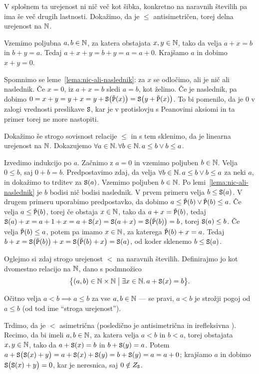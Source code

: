 V splošnem ta urejenost ni nič več kot šibka, konkretno na naravnih številih pa ima še več drugih lastnosti. Dokažimo, da je $\leq$ antisimetričen, torej delna urejenost na $\mathbb{N}$.

Vzemimo poljubna $a, b \in \mathbb{N}$, za katera obstajata $x, y \in \mathbb{N}$, tako da velja $a + x = b$ in $b + y = a$. Tedaj $a + x + y = b + y = a = a + 0$. Krajšamo $a$ in dobimo $x + y = 0$.

Spomnimo se leme~\ref{lema:nic-ali-naslednik}: za $x$ se odločimo, ali je nič ali naslednik. Če $x = 0$, iz $a + x = b$ sledi $a = b$, kot želimo. Če je naslednik, pa dobimo $0 = x + y = y + x = y + \mathtt{S}\big(\tilde{\mathtt{P}}(x)\big) = \mathtt{S}\big(y + \tilde{\mathtt{P}}(x)\big)$. To bi pomenilo, da je $0$ v zalogi vrednosti preslikave $\mathtt{S}$, kar je v protislovju s Peanovimi aksiomi in ta primer torej ne more nastopiti.

Dokažimo še strogo sovisnost relacije $\leq$ in s tem sklenimo, da je linearna urejenost na $\mathbb{N}$. Dokazujemo $\forall a \in \mathbb{N} .\,\forall b \in \mathbb{N} .\,{a \leq b \lor b \leq a}$.

Izvedimo indukcijo po $a$. Začnimo z $a = 0$ in vzemimo poljuben $b \in \mathbb{N}$. Velja $0 \leq b$, saj $0 + b = b$. Predpostavimo zdaj, da velja $\forall b \in \mathbb{N} .\,{a \leq b \lor b \leq a}$ za neki $a$, in dokažimo to trditev za $\mathtt{S}(a)$. Vzemimo poljuben $b \in \mathbb{N}$. Po lemi~\ref{lema:nic-ali-naslednik} je $b$ bodisi nič bodisi naslednik. V prvem primeru velja $b \leq \mathtt{S}(a)$. V drugem primeru uporabimo predpostavko, da dobimo $a \leq \tilde{\mathtt{P}}(b) \lor \tilde{\mathtt{P}}(b) \leq a$. Če velja $a \leq \tilde{\mathtt{P}}(b)$, torej če obstaja $x \in \mathbb{N}$, tako da $a + x = \tilde{\mathtt{P}}(b)$, tedaj $\mathtt{S}(a) + x = a + 1 + x = a + \mathtt{S}(x) = \mathtt{S}(a + x) = \mathtt{S}\big(\tilde{\mathtt{P}}(b)\big) = b$, torej $\mathtt{S}(a) \leq b$. Če velja $\tilde{\mathtt{P}}(b) \leq a$, potem pa imamo $x \in \mathbb{N}$, za katerega $\tilde{\mathtt{P}}(b) + x = a$. Tedaj $b + x = \mathtt{S}\big(\tilde{\mathtt{P}}(b)\big) + x = \mathtt{S}\big(\tilde{\mathtt{P}}(b) + x\big) = \mathtt{S}(a)$, od koder sklenemo $b \leq \mathtt{S}(a)$.

Oglejmo si zdaj strogo urejenost $<$ na naravnih številih.  Definirajmo jo kot dvomestno relacijo na $\mathbb{N}$, dano s podmnožico
\[\set[1]{(a, b) \in \NN \times \NN}{\some{x \in \NN}{a + \suc(x) = b}}.\]

Očitno velja $a < b \implies a \leq b$ za vse $a, b \in \mathbb{N}$ --- se pravi, $a < b$ je strožji pogoj od $a \leq b$ (od tod ime ``stroga urejenost'').

Trdimo, da je $<$ asimetrična (posledično je antisimetrična in irefleksivna ). Recimo, da bi imeli $a, b \in \mathbb{N}$, za katera velja $a < b$ in $b < a$, torej obstajata $x, y \in \mathbb{N}$, tako da $a + \mathtt{S}(x) = b$ in $b + \mathtt{S}(y) = a$. Potem $a + \mathtt{S}\big(\mathtt{S}(x) + y\big) = a + \mathtt{S}(x) + \mathtt{S}(y) = b + \mathtt{S}(y) = a = a + 0$; krajšamo $a$ in dobimo $\mathtt{S}\big(\mathtt{S}(x) + y\big) = 0$, kar je neresnica, saj $0 \notin Z_{\mathtt{S}}$.

